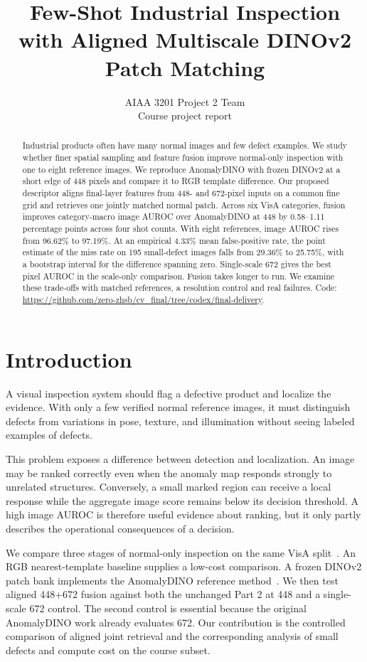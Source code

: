 \documentclass[10pt,twocolumn,letterpaper]{article}
\title{Few-Shot Industrial Inspection with Aligned Multiscale DINOv2 Patch Matching}
\author{AIAA 3201 Project 2 Team\\Course project report}
\begin{document}
\maketitle
\begin{abstract}
Industrial products often have many normal images and few defect examples. We study whether finer spatial sampling and feature fusion improve normal-only inspection with one to eight reference images. We reproduce AnomalyDINO with frozen DINOv2 at a short edge of 448 pixels and compare it to RGB template difference. Our proposed descriptor aligns final-layer features from 448- and 672-pixel inputs on a common fine grid and retrieves one jointly matched normal patch. Across six VisA categories, fusion improves category-macro image AUROC over AnomalyDINO at 448 by 0.58--1.11 percentage points across four shot counts. With eight references, image AUROC rises from 96.62\% to 97.19\%. At an empirical 4.33\% mean false-positive rate, the point estimate of the miss rate on 195 small-defect images falls from 29.36\% to 25.75\%, with a bootstrap interval for the difference spanning zero. Single-scale 672 gives the best pixel AUROC in the scale-only comparison. Fusion takes longer to run. We examine these trade-offs with matched references, a resolution control and real failures. Code: \url{https://github.com/zero-zhsb/cv_final/tree/codex/final-delivery}.
\end{abstract}

\section{Introduction}
A visual inspection system should flag a defective product and localize the evidence. With only a few verified normal reference images, it must distinguish defects from variations in pose, texture, and illumination without seeing labeled examples of defects.

This problem exposes a difference between detection and localization. An image may be ranked correctly even when the anomaly map responds strongly to unrelated structures. Conversely, a small marked region can receive a local response while the aggregate image score remains below its decision threshold. A high image AUROC is therefore useful evidence about ranking, but it only partly describes the operational consequences of a decision.

We compare three stages of normal-only inspection on the same VisA split~\cite{zou2022visa}. An RGB nearest-template baseline supplies a low-cost comparison. A frozen DINOv2 patch bank implements the AnomalyDINO reference method~\cite{damm2025anomalydino,oquab2024dinov2}. We then test aligned 448+672 fusion against both the unchanged Part 2 at 448 and a single-scale 672 control. The second control is essential because the original AnomalyDINO work already evaluates 672. Our contribution is the controlled comparison of aligned joint retrieval and the corresponding analysis of small defects and compute cost on the course subset.
\end{document}
